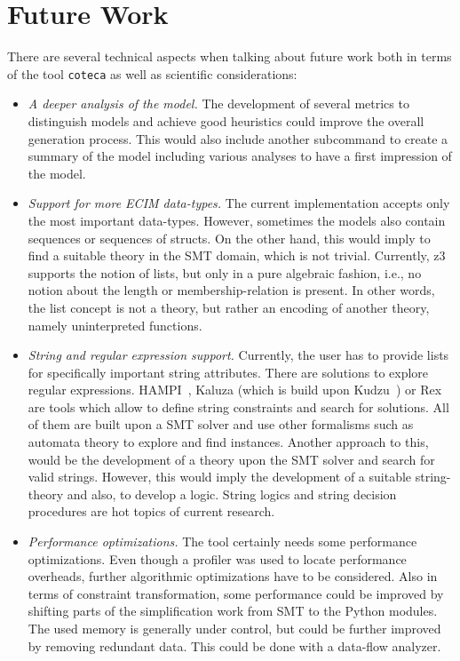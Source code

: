 \section{Future Work}

There are several technical aspects when talking about future work both in terms of the tool \verb|coteca| as well as scientific considerations:
\begin{itemize}
 \item \emph{A deeper analysis of the model.} The development of several metrics to distinguish models and achieve good heuristics could improve the overall generation process. This would also include another subcommand to create a summary of the model including various analyses to have a first impression of the model.
 
 \item \emph{Support for more ECIM data-types.} The current implementation accepts only the most important data-types. However, sometimes the models also contain sequences or sequences of structs. On the other hand, this would imply to find a suitable theory in the SMT domain, which is not trivial. Currently, z3 supports the notion of lists, but only in a pure algebraic fashion, i.e., no notion about the length or membership-relation is present. In other words, the list concept is not a theory, but rather an encoding of another theory, namely uninterpreted functions.
 
 \item \emph{String and regular expression support.} Currently, the user has to provide lists for specifically important string attributes. There are solutions to explore regular expressions. HAMPI~\cite{hampi}, Kaluza (which is build upon Kudzu~\cite{kudzu}) or Rex~\cite{rex} are tools which allow to define string constraints and search for solutions. All of them are built upon a SMT solver and use other formalisms such as automata theory to explore and find instances. Another approach to this, would be the development of a theory upon the SMT solver and search for valid strings. However, this would imply the development of a suitable string-theory and also, to develop a logic. String logics and string decision procedures are hot topics of current research.
 
 \item \emph{Performance optimizations.} The tool certainly needs some performance optimizations. Even though a profiler was used to locate performance overheads, further algorithmic optimizations have to be considered. Also in terms of constraint transformation, some performance could be improved by shifting parts of the simplification work from SMT to the Python modules. The used memory is generally under control, but could be further improved by removing redundant data. This could be done with a data-flow analyzer.
 

\end{itemize}
